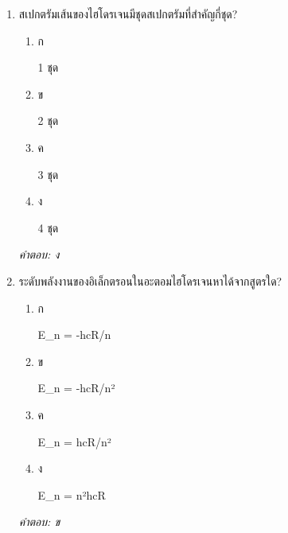 \documentclass[12pt]{article}
\begin{document}
\begin{enumerate}[label=\arabic*., itemsep=0.5\baselineskip, topsep=0.5\baselineskip, leftmargin=*]
\item สเปกตรัมเส้นของไฮโดรเจนมีชุดสเปกตรัมที่สำคัญกี่ชุด?
\begin{enumerate}[label=\alph*)., itemsep=0.3\baselineskip, topsep=0.3\baselineskip]
\item ก\ 
\begin{minipage}[t]{0.9\linewidth}
\raggedright 1 ชุด
\end{minipage}
\item ข\ 
\begin{minipage}[t]{0.9\linewidth}
\raggedright 2 ชุด
\end{minipage}
\item ค\ 
\begin{minipage}[t]{0.9\linewidth}
\raggedright 3 ชุด
\end{minipage}
\item ง\ 
\begin{minipage}[t]{0.9\linewidth}
\raggedright 4 ชุด
\end{minipage}
\end{enumerate}
\vspace{-0.3\baselineskip}
\begin{small}
\textit{คำตอบ: ง}
\end{small}

\item ระดับพลังงานของอิเล็กตรอนในอะตอมไฮโดรเจนหาได้จากสูตรใด?
\begin{enumerate}[label=\alph*)., itemsep=0.3\baselineskip, topsep=0.3\baselineskip]
\item ก\ 
\begin{minipage}[t]{0.9\linewidth}
\raggedright E\_n = -hcR/n
\end{minipage}
\item ข\ 
\begin{minipage}[t]{0.9\linewidth}
\raggedright E\_n = -hcR/n²
\end{minipage}
\item ค\ 
\begin{minipage}[t]{0.9\linewidth}
\raggedright E\_n = hcR/n²
\end{minipage}
\item ง\ 
\begin{minipage}[t]{0.9\linewidth}
\raggedright E\_n = n²hcR
\end{minipage}
\end{enumerate}
\vspace{-0.3\baselineskip}
\begin{small}
\textit{คำตอบ: ข}
\end{small}


\end{enumerate}
\end{document}
